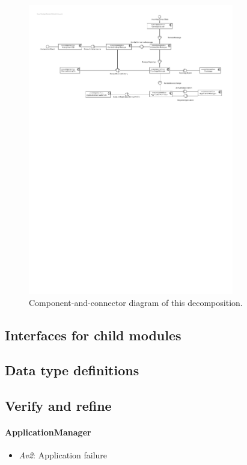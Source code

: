 \documentclass[english]{sareport}
\begin{document}
\begin{figure}[!htp]
	\centering
	\includegraphics[width=0.8\textwidth]{component_diagram_2.pdf}
	\caption{Component-and-connector diagram of this decomposition.
	}\label{fig:it2-cc_main}
\end{figure}


\subsection{Interfaces for child modules}
\subsection{Data type definitions}
\subsection{Verify and refine}

\paragraph{ApplicationManager}
\begin{itemize}
	\item \emph{Av2}: Application failure
\end{itemize}
\end{document}

